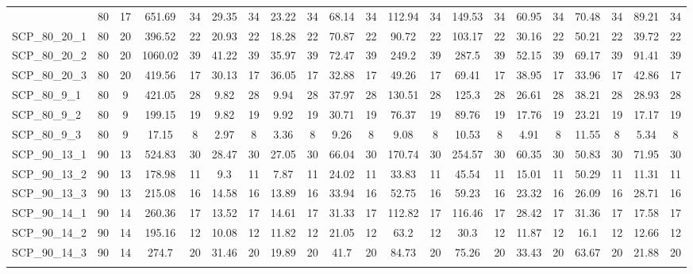 \begin{sidewaystable}[!ht]
{\begin{tabular}{lcccccccccccccccccccc}
{SCP\_80\_17\_3 & 80 & 17 & 651.69 & 34 & 29.35 & 34 &  \textcolor{blue2}{23.22} & 34 & 68.14 & 34 & 112.94 & 34 & 149.53 & 34 & 60.95 & 34 & 70.48 & 34 & 89.21 & 34 \\
SCP\_80\_20\_1 & 80 & 20 & 396.52 & 22 & 20.93 & 22 &  \textcolor{blue2}{18.28} & 22 & 70.87 & 22 & 90.72 & 22 & 103.17 & 22 & 30.16 & 22 & 50.21 & 22 & 39.72 & 22 \\
SCP\_80\_20\_2 & 80 & 20 & 1060.02 & 39 & 41.22 & 39 &  \textcolor{blue2}{35.97} & 39 & 72.47 & 39 & 249.2 & 39 & 287.5 & 39 & 52.15 & 39 & 69.17 & 39 & 91.41 & 39 \\
SCP\_80\_20\_3 & 80 & 20 & 419.56 & 17 &  \textcolor{blue2}{30.13} & 17 & 36.05 & 17 & 32.88 & 17 & 49.26 & 17 & 69.41 & 17 & 38.95 & 17 & 33.96 & 17 & 42.86 & 17 \\
SCP\_80\_9\_1 & 80 & 9 & 421.05 & 28 &  \textcolor{blue2}{9.82} & 28 & 9.94 & 28 & 37.97 & 28 & 130.51 & 28 & 125.3 & 28 & 26.61 & 28 & 38.21 & 28 & 28.93 & 28 \\
SCP\_80\_9\_2 & 80 & 9 & 199.15 & 19 &  \textcolor{blue2}{9.82} & 19 & 9.92 & 19 & 30.71 & 19 & 76.37 & 19 & 89.76 & 19 & 17.76 & 19 & 23.21 & 19 & 17.17 & 19 \\
SCP\_80\_9\_3 & 80 & 9 & 17.15 & 8 &  \textcolor{blue2}{2.97} & 8 & 3.36 & 8 & 9.26 & 8 & 9.08 & 8 & 10.53 & 8 & 4.91 & 8 & 11.55 & 8 & 5.34 & 8 \\
SCP\_90\_13\_1 & 90 & 13 & 524.83 & 30 & 28.47 & 30 &  \textcolor{blue2}{27.05} & 30 & 66.04 & 30 & 170.74 & 30 & 254.57 & 30 & 60.35 & 30 & 50.83 & 30 & 71.95 & 30 \\
SCP\_90\_13\_2 & 90 & 13 & 178.98 & 11 & 9.3 & 11 &  \textcolor{blue2}{7.87} & 11 & 24.02 & 11 & 33.83 & 11 & 45.54 & 11 & 15.01 & 11 & 50.29 & 11 & 11.31 & 11 \\
SCP\_90\_13\_3 & 90 & 13 & 215.08 & 16 & 14.58 & 16 &  \textcolor{blue2}{13.89} & 16 & 33.94 & 16 & 52.75 & 16 & 59.23 & 16 & 23.32 & 16 & 26.09 & 16 & 28.71 & 16 \\
SCP\_90\_14\_1 & 90 & 14 & 260.36 & 17 &  \textcolor{blue2}{13.52} & 17 & 14.61 & 17 & 31.33 & 17 & 112.82 & 17 & 116.46 & 17 & 28.42 & 17 & 31.36 & 17 & 17.58 & 17 \\
SCP\_90\_14\_2 & 90 & 14 & 195.16 & 12 &  \textcolor{blue2}{10.08} & 12 & 11.82 & 12 & 21.05 & 12 & 63.2 & 12 & 30.3 & 12 & 11.87 & 12 & 16.1 & 12 & 12.66 & 12 \\
SCP\_90\_14\_3 & 90 & 14 & 274.7 & 20 & 31.46 & 20 &  \textcolor{blue2}{19.89} & 20 & 41.7 & 20 & 84.73 & 20 & 75.26 & 20 & 33.43 & 20 & 63.67 & 20 & 21.88 & 20 \\
}
\end{tabular}}
\end{sidewaystable}
